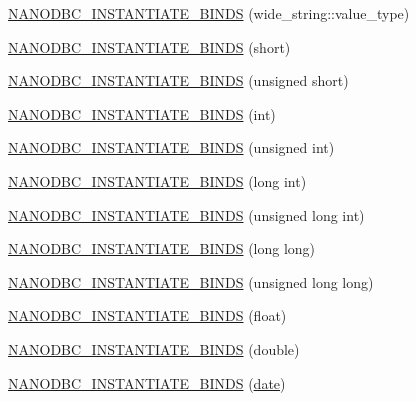 \begin{DoxyCompactItemize}
\item 
\mbox{\hyperlink{namespacenanodbc_a065aa26d5702d7955bc669b4a2e64908}{N\+A\+N\+O\+D\+B\+C\+\_\+\+I\+N\+S\+T\+A\+N\+T\+I\+A\+T\+E\+\_\+\+B\+I\+N\+DS}} (wide\+\_\+string\+::value\+\_\+type)
\item 
\mbox{\hyperlink{namespacenanodbc_a115ad39b53c312d2ab2641325206061f}{N\+A\+N\+O\+D\+B\+C\+\_\+\+I\+N\+S\+T\+A\+N\+T\+I\+A\+T\+E\+\_\+\+B\+I\+N\+DS}} (short)
\item 
\mbox{\hyperlink{namespacenanodbc_afcfd3c5f4a6829effff407fe9c21a872}{N\+A\+N\+O\+D\+B\+C\+\_\+\+I\+N\+S\+T\+A\+N\+T\+I\+A\+T\+E\+\_\+\+B\+I\+N\+DS}} (unsigned short)
\item 
\mbox{\hyperlink{namespacenanodbc_a80ac2da1a14bdbd348859d09f060e6b7}{N\+A\+N\+O\+D\+B\+C\+\_\+\+I\+N\+S\+T\+A\+N\+T\+I\+A\+T\+E\+\_\+\+B\+I\+N\+DS}} (int)
\item 
\mbox{\hyperlink{namespacenanodbc_a582f84a436ec19bbf41d8427f23e43a8}{N\+A\+N\+O\+D\+B\+C\+\_\+\+I\+N\+S\+T\+A\+N\+T\+I\+A\+T\+E\+\_\+\+B\+I\+N\+DS}} (unsigned int)
\item 
\mbox{\hyperlink{namespacenanodbc_a4b9a8566c0dbaf1b795ae4b004411dd1}{N\+A\+N\+O\+D\+B\+C\+\_\+\+I\+N\+S\+T\+A\+N\+T\+I\+A\+T\+E\+\_\+\+B\+I\+N\+DS}} (long int)
\item 
\mbox{\hyperlink{namespacenanodbc_adfa6e8f3936895382ccd66af6a22161f}{N\+A\+N\+O\+D\+B\+C\+\_\+\+I\+N\+S\+T\+A\+N\+T\+I\+A\+T\+E\+\_\+\+B\+I\+N\+DS}} (unsigned long int)
\item 
\mbox{\hyperlink{namespacenanodbc_aed0d204bb9f87edd36cbd9d18cb70a32}{N\+A\+N\+O\+D\+B\+C\+\_\+\+I\+N\+S\+T\+A\+N\+T\+I\+A\+T\+E\+\_\+\+B\+I\+N\+DS}} (long long)
\item 
\mbox{\hyperlink{namespacenanodbc_af4351155ee0f8b078d91b0774457b9f9}{N\+A\+N\+O\+D\+B\+C\+\_\+\+I\+N\+S\+T\+A\+N\+T\+I\+A\+T\+E\+\_\+\+B\+I\+N\+DS}} (unsigned long long)
\item 
\mbox{\hyperlink{namespacenanodbc_a658fb25530270ac5f3853842e1514150}{N\+A\+N\+O\+D\+B\+C\+\_\+\+I\+N\+S\+T\+A\+N\+T\+I\+A\+T\+E\+\_\+\+B\+I\+N\+DS}} (float)
\item 
\mbox{\hyperlink{namespacenanodbc_a6a46d28d2f51a6199c30d1ee94d899cd}{N\+A\+N\+O\+D\+B\+C\+\_\+\+I\+N\+S\+T\+A\+N\+T\+I\+A\+T\+E\+\_\+\+B\+I\+N\+DS}} (double)
\item 
\mbox{\hyperlink{namespacenanodbc_a1c5c5ecb254381e457c3096204a1af99}{N\+A\+N\+O\+D\+B\+C\+\_\+\+I\+N\+S\+T\+A\+N\+T\+I\+A\+T\+E\+\_\+\+B\+I\+N\+DS}} (\mbox{\hyperlink{structnanodbc_1_1date}{date}})
\item 

\end{DoxyCompactItemize}
